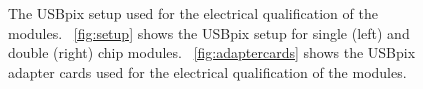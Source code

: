 \begin{figure}
	\centering
	\null\hfill
	\null\hfill
\hfill\null
       \caption{The USBpix setup used for the electrical qualification of the modules. ~\ref{fig:setup} shows the USBpix setup for single (left) and double (right) chip modules. ~\ref{fig:adaptercards} shows the USBpix adapter cards used for the electrical qualification of the modules.}
        \label{figure:USBpixsetup}
\end{figure}


